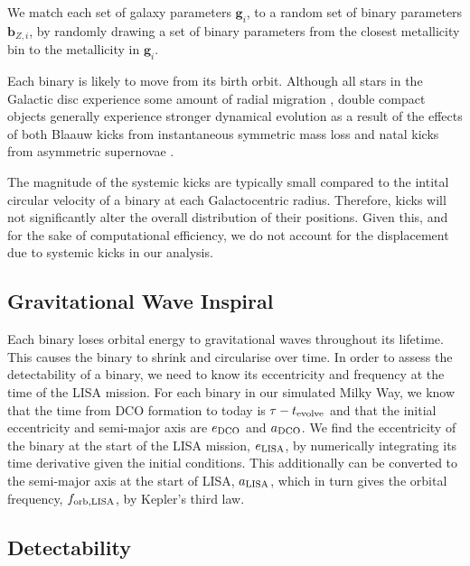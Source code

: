 \documentclass[twocolumn]{aastex63}
\begin{document}
We match each set of galaxy parameters $\mathbf{g}_{{i}}$, to a random set of binary parameters $\mathbf{b}_{{Z, i}}$, by randomly drawing a set of binary parameters from the closest metallicity bin to the metallicity in $\mathbf{g}_{{i}}$.

Each binary is likely to move from its birth orbit. Although all stars in the Galactic disc experience some amount of radial migration \citep{Sellwood+2002, Frankel+2018}, double compact objects generally experience stronger dynamical evolution as a result of the effects of both Blaauw kicks from instantaneous symmetric mass loss \citep{Blaauw+1961} and natal kicks from asymmetric supernovae \citep{Hobbs+2005}.

The magnitude of the systemic kicks are typically small compared to the intital circular velocity of a binary at each Galactocentric radius. Therefore, kicks will not significantly alter the overall distribution of their positions. Given this, and for the sake of computational efficiency, we do not account for the displacement due to systemic kicks in our analysis.

\subsection{Gravitational Wave Inspiral}

Each binary loses orbital energy to gravitational waves throughout its lifetime. This causes the binary to shrink and circularise over time. In order to assess the detectability of a binary, we need to know its eccentricity and frequency at the time of the LISA mission. For each binary in our simulated Milky Way, we know that the time from DCO formation to today is $\tau - t_{\rm evolve}$ and that the initial eccentricity and semi-major axis are $e_{\rm DCO}$ and $a_{\rm DCO}$. We find the eccentricity of the binary at the start of the LISA mission, $e_{\rm LISA}$, by numerically integrating its time derivative \citep[][Eq. 5.13]{Peters+1964} given the initial conditions. This additionally can be converted to the semi-major axis at the start of LISA, $a_{\rm LISA} $\citep[][Eq. 5.11]{Peters+1964}, which in turn gives the orbital frequency, $f_{\rm orb, LISA}$, by Kepler's third law.

\subsection{Detectability}
\end{document}
